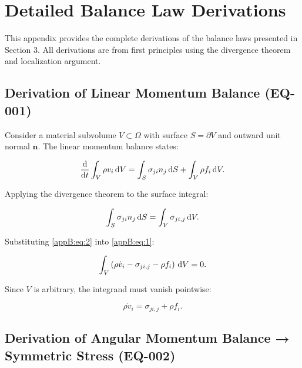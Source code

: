\section{Detailed Balance Law Derivations}
\label{app:balance_derivations}

This appendix provides the complete derivations of the balance laws presented in Section 3. All derivations are from first principles using the divergence theorem and localization argument.

\subsection{Derivation of Linear Momentum Balance (EQ-001)}

Consider a material subvolume $V \subset \Omega$ with surface $S = \partial V$ and outward unit normal $\bm{n}$. The linear momentum balance states:

\begin{equation}
\frac{\mathrm{d}}{\mathrm{d} t}\int_V \rho v_i \, \mathrm{d} V
=
\int_S \sigma_{ji} n_j \, \mathrm{d} S
+
\int_V \rho f_i \, \mathrm{d} V.
\label{appB:eq:1}
\end{equation}

Applying the divergence theorem to the surface integral:

\begin{equation}
\int_S \sigma_{ji} n_j \, \mathrm{d} S
=
\int_V \sigma_{ji,j} \, \mathrm{d} V.
\label{appB:eq:2}
\end{equation}

Substituting \eqref{appB:eq:2} into \eqref{appB:eq:1}:

\begin{equation}
\int_V \left(\rho \dot{v}_i - \sigma_{ji,j} - \rho f_i\right) \, \mathrm{d} V = 0.
\label{appB:eq:3}
\end{equation}

Since $V$ is arbitrary, the integrand must vanish pointwise:

\begin{equation}
\rho \dot{v}_i = \sigma_{ji,j} + \rho f_i.
\label{appB:eq:4}
\end{equation}

\subsection{Derivation of Angular Momentum Balance → Symmetric Stress (EQ-002)}

